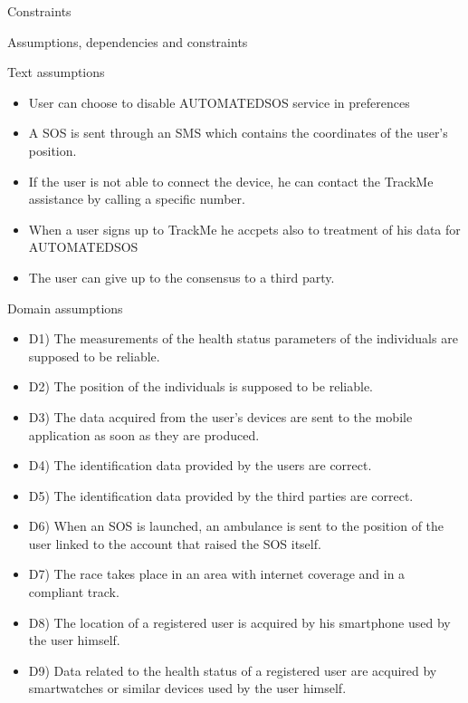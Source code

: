 \documentclass{article}
\begin{document}
\begin{legal}
\begin{legal}
		\item Constraints \\
		\item Assumptions, dependencies and constraints\\
			\begin{legal}
    			\item Text assumptions\\
    			{\normalfont
				\begin{itemize}
					\item User can choose to disable AUTOMATEDSOS service in preferences
					\item A SOS is sent through an SMS which contains the coordinates of the user's position.
					\item If the user is not able to connect the device, he can contact the TrackMe assistance by calling a specific number.
					\item When a user signs up to TrackMe he accpets also to treatment of his data for AUTOMATEDSOS
					\item The user can give up to the consensus to a third party.
				\end{itemize}}
			\item Domain assumptions \\
			{\normalfont
				\begin{itemize}
				\item D1) The measurements of the health status parameters of the individuals are supposed to be reliable.\\
				\item D2) The position of the individuals is supposed to be reliable.\\
				\item D3) The data acquired from the user’s devices are sent to the mobile application as soon as they are produced.\\
				\item D4) The identification data provided by the users are correct.\\
				\item D5) The identification data provided by the third parties are correct.\\
				\item D6) When an SOS is launched, an ambulance is sent to the position of the user linked to the account that raised the SOS itself. \\
				\item D7) The race takes place in an area with internet coverage and in a compliant track.\\
				\item D8) The location of a registered user is acquired by his smartphone used by the user himself.\\
				\item D9) Data related to the health status of a registered user are acquired by smartwatches or similar devices used by the user himself.\\
				\end{itemize}
			}
			\end{legal}
		\end{legal}
	

\end{legal}
\end{document}

